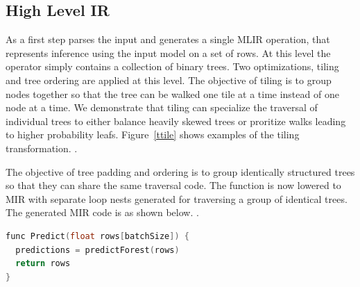 \subsection{High Level IR}
As a first step \Treebeard{} parses the input and generates a single MLIR operation,  that represents inference using the input model on a set of rows. 
At this level the operator simply contains a collection of binary trees. Two optimizations, tiling and tree ordering are applied at this level. The objective of tiling is to group nodes together so that the tree can be walked one tile at a time instead of one node at a time. We demonstrate that tiling can specialize the traversal of individual trees to either balance heavily skewed trees or proritize walks leading to higher probability leafs. Figure~\ref{ttile} shows examples of the tiling transformation. . 

The objective of tree padding and ordering is to group identically structured trees so that they can share the same traversal code. The  function is now lowered to MIR with separate loop nests generated for traversing a group of identical trees. The generated MIR code is as shown below. 
.



\begin{lstlisting}[language=C++]
func Predict(float rows[batchSize]) {
  predictions = predictForest(rows) 
  return rows
}
\end{lstlisting}

